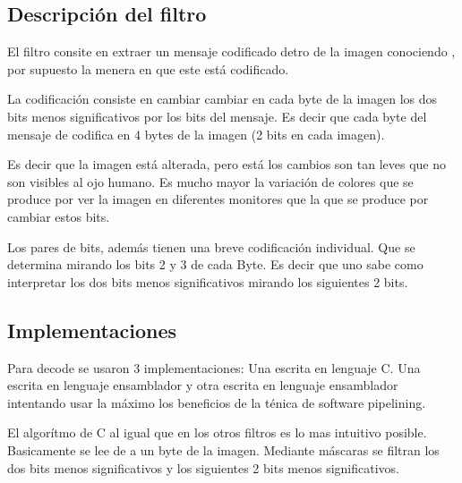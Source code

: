 \begin{comment}
	- Comparación c y asm.
		- La mayor diferencia es que se levanta de a más.
	- El tiempo en asm es súper constante porque sólo depende de size. En c mas o menos, explicar por qué.
	- Hay un caso límite. Explicar. Aunque se trata como un chorizo.
	- Explicar optimización del acceso a memoria.
	- Explicar por qué no se puede hacer tanta ejcución fuera de orden. Hay dependencia de datos.
	- ¿Que pesa más?¿Procesamiento o acceso a memoria?

\end{comment}

\subsection{Descripción del filtro}

	El filtro consite en extraer un mensaje codificado detro de la imagen conociendo
, por supuesto la menera en que este está codificado.

	La codificación consiste en cambiar cambiar en cada byte de la imagen los
dos bits menos significativos por los bits del mensaje. Es decir que cada
byte del mensaje de codifica en 4 bytes de la imagen (2 bits en cada imagen).

	Es decir que la imagen está alterada, pero está los cambios son tan leves
que no son visibles al ojo humano. Es mucho mayor la variación de colores que
se produce por ver la imagen en diferentes monitores que la que se produce
por cambiar estos bits.

	Los pares de bits, además tienen una breve codificación individual. Que
se determina mirando los bits 2 y 3 de cada Byte. Es decir que uno sabe
como interpretar los dos bits menos significativos mirando los siguientes
2 bits.


\subsection{Implementaciones}


	Para decode se usaron 3 implementaciones: Una escrita en lenguaje C.
Una escrita en lenguaje ensamblador y otra escrita en lenguaje ensamblador
intentando usar la máximo los beneficios de la ténica de software pipelining.

	El algorítmo de C al igual que en los otros filtros es lo mas intuitivo posible.
Basicamente se lee de a un byte de la imagen. Mediante máscaras se filtran los dos bits
menos significativos y los siguientes 2 bits menos significativos.

